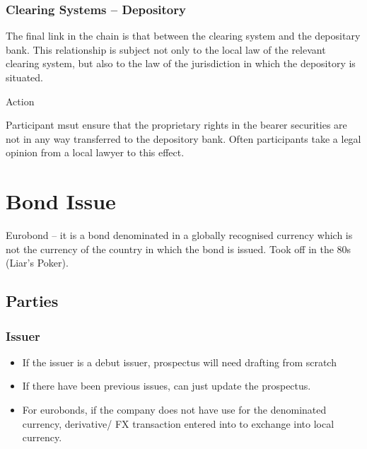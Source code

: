 \documentclass[
]{article}
\providecommand{\tightlist}{%
  \setlength{\itemsep}{0pt}\setlength{\parskip}{0pt}}
\newenvironment{env-02bd7092-3a62-48e4-8d01-dc71013a2f49}
{
    \savenotes\tcolorbox[blanker,breakable,left=5pt,borderline west={2pt}{-4pt}{aquamarine}]
}
{
    \endtcolorbox\spewnotes
}
\begin{document}
\hypertarget{clearing-systems-depository}{%
\subsubsection{Clearing Systems --
Depository}\label{clearing-systems-depository}}

The final link in the chain is that between the clearing system and the
depositary bank. This relationship is subject not only to the local law
of the relevant clearing system, but also to the law of the jurisdiction
in which the depository is situated.

\begin{env-02bd7092-3a62-48e4-8d01-dc71013a2f49}

Action

Participant msut ensure that the proprietary rights in the bearer
securities are not in any way transferred to the depository bank. Often
participants take a legal opinion from a local lawyer to this effect.

\end{env-02bd7092-3a62-48e4-8d01-dc71013a2f49}

\hypertarget{bond-issue}{%
\section{Bond Issue}\label{bond-issue}}

Eurobond -- it is a bond denominated in a globally recognised currency
which is not the currency of the country in which the bond is issued.
Took off in the 80s (Liar's Poker).

\hypertarget{parties}{%
\subsection{Parties}\label{parties}}

\hypertarget{issuer}{%
\subsubsection{Issuer}\label{issuer}}

\begin{itemize}
\tightlist
\item
  If the issuer is a debut issuer, prospectus will need drafting from
  scratch
\item
  If there have been previous issues, can just update the prospectus.
\item
  For eurobonds, if the company does not have use for the denominated
  currency, derivative/ FX transaction entered into to exchange into
  local currency.
\end{itemize}
\end{document}
